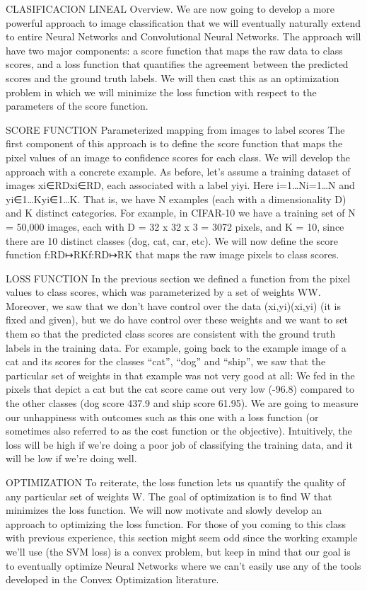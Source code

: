 CLASIFICACION LINEAL
Overview. We are now going to develop a more powerful approach to image classification that we will eventually naturally extend to entire Neural Networks and 
Convolutional Neural Networks. The approach will have two major components: a score function that maps the raw data to class scores, and a loss function that quantifies 
the agreement between the predicted scores and the ground truth labels. We will then cast this as an optimization problem in which we will minimize the loss function 
with respect to the parameters of the score function.


SCORE FUNCTION Parameterized mapping from images to label scores
The first component of this approach is to define the score function that maps the pixel values of an image to confidence scores for each class.
We will develop the approach with a concrete example. As before, let’s assume a training dataset of images xi∈RDxi∈RD, each associated with a label yiyi. 
Here i=1…Ni=1…N and yi∈1…Kyi∈1…K. That is, we have N examples (each with a dimensionality D) and K distinct categories. 
For example, in CIFAR-10 we have a training set of N = 50,000 images, each with D = 32 x 32 x 3 = 3072 pixels, and K = 10, since there are 10 distinct classes (dog, cat, car, etc).
We will now define the score function f:RD↦RKf:RD↦RK that maps the raw image pixels to class scores.

LOSS FUNCTION
In the previous section we defined a function from the pixel values to class scores, which was parameterized by a set of weights WW. 
Moreover, we saw that we don’t have control over the data (xi,yi)(xi,yi) (it is fixed and given), but we do have control over these weights and we want to set 
them so that the predicted class scores are consistent with the ground truth labels in the training data.
For example, going back to the example image of a cat and its scores for the classes “cat”, “dog” and “ship”, we saw that the particular set of weights in that example 
was not very good at all: We fed in the pixels that depict a cat but the cat score came out very low (-96.8) compared to the other classes (dog score 437.9 and ship score 61.95).
We are going to measure our unhappiness with outcomes such as this one with a loss function (or sometimes also referred to as the cost function or the objective). 
Intuitively, the loss will be high if we’re doing a poor job of classifying the training data, and it will be low if we’re doing well.


OPTIMIZATION
To reiterate, the loss function lets us quantify the quality of any particular set of weights W. The goal of optimization is to find W that minimizes the loss function.
We will now motivate and slowly develop an approach to optimizing the loss function. 
For those of you coming to this class with previous experience, this section might seem odd since the working example we’ll use (the SVM loss) is a convex problem,
but keep in mind that our goal is to eventually optimize Neural Networks where we can’t easily use any of the tools developed in the Convex Optimization literature.


